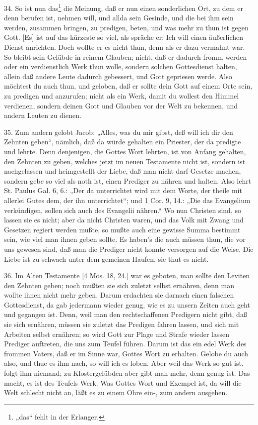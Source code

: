 34. So ist nun das\footnote{„das“ fehlt in der Erlanger.} die Meinung, daß er nun einen sonderlichen Ort, zu dem er denn berufen ist, nehmen will, und allda sein Gesinde, und die bei ihm sein werden, zusammen bringen, zu predigen, beten, und was mehr zu thun ist gegen Gott. [Es] ist auf das kürzeste so viel,
als spräche er: Ich will einen äußerlichen Dienst anrichten. Doch wollte er es nicht thun, denn als er dazu vermahnt war. So bleibt sein Gelübde in reinem Glauben; nicht, daß er dadurch fromm werden oder ein verdienstlich Werk thun wolle, sondern solchen Gottesdienst halten, allein daß andere Leute dadurch gebessert, und Gott gepriesen werde. Also möchtest du auch thun, und geloben, daß er sollte dein Gott auf einem Orte sein, zu predigen und anzurufen; nicht als ein Werk, damit du wollest den Himmel verdienen, sondern deinen Gott und Glauben vor der Welt zu bekennen, und andern Leuten zu dienen.

35. Zum andern gelobt Jacob: „Alles, was du mir gibst, deß will ich dir den Zehnten geben“, nämlich, daß da würde gehalten ein Priester, der da predigte und lehrte. Denn denjenigen, die Gottes Wort lehrten, ist von Anfang gehalten, den Zehnten zu geben, welches jetzt im neuen Testamente nicht ist, sondern ist nachgelassen und heimgestellt der Liebe, daß man nicht darf Gesetze machen, sondern gebe so viel als noth ist, einen Prediger zu nähren und halten. Also lehrt St. Paulus Gal. 6, 6.: „Der da unterrichtet wird mit dem Worte, der theile mit allerlei Gutes dem, der ihn unterrichtet“; und 1 Cor. 9, 14.: „Die das Evangelium verkündigen, sollen sich auch des Evangelii nähren.“ Wo nun Christen sind, so lassen sie es nicht; aber da nicht Christen waren, und das Volk mit Zwang und Gesetzen regiert werden mußte, so mußte auch eine gewisse Summa bestimmt sein, wie viel man ihnen geben sollte. Es haben’s die auch müssen thun, die vor uns gewesen sind, daß man die Prediger nicht konnte versorgen auf die Weise. Die Liebe ist zu schwach unter dem gemeinen Haufen, sie thut es nicht.

36. Im Alten Testamente [4 Mos. 18, 24.] war es geboten, man sollte den Leviten den Zehnten geben; noch mußten sie sich zuletzt selbst ernähren, denn man wollte ihnen nicht mehr geben. Darum erdachten sie darnach einen falschen Gottesdienst, da gab jedermann wieder genug, wie es zu unsern Zeiten auch geht und gegangen ist. Denn, weil man den rechtschaffenen Predigern nicht gibt, daß sie sich ernähren, müssen sie zuletzt das Predigen fahren lassen, und sich mit Arbeiten selbst ernähren; so wird Gott zur Plage und Strafe wieder lassen Prediger auftreten, die uns zum Teufel führen. Darum ist das ein edel Werk des frommen Vaters, daß er im Sinne war, Gottes Wort zu erhalten. Gelobe du auch also, und thue es ihm nach, so will ich es loben. Aber weil das Werk so gut ist, folgt ihm niemand; zu Klostergelübden aber gibt man mehr, denn genug ist. Das macht, es ist des Teufels Werk. Was Gottes Wort und Exempel ist, da will die Welt schlecht nicht an, läßt es zu einem Ohre ein-, zum andern ausgehen.

